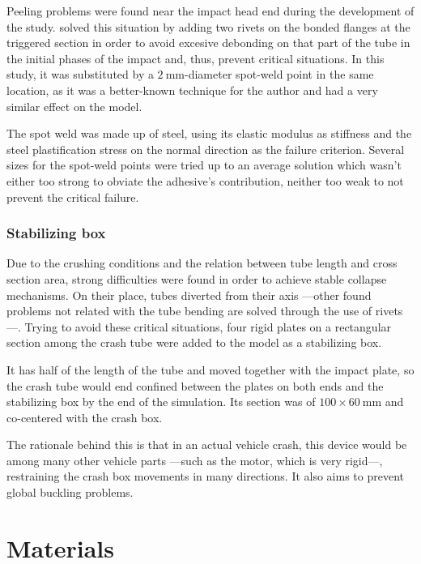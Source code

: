 \documentclass[
documentsize = a4, %
font = cmr, %
typesize = 11, %
printmode = true,
onehalfspacing = true,
language = en, %
titlepage = udciccp, %
degree = pt, %
dedication = true,
acknowledgements = true,
abstract-en = true,
abstract-es = false,
abstract-ga = false,
epigraphs = true,
toc = true,
lof = true,
lot = true,
frontmatterintoc = false,
notation = false,
minimal = false,
]{UDCthesis}
\begin{document}
Peeling problems were found near the impact head end during the development of the study. \citet{Peroni2009} solved this situation by adding two rivets on the bonded flanges at the triggered section in order to avoid excesive debonding on that part of the tube in the initial phases of the impact and, thus, prevent critical situations. In this study, it was substituted by a $\SI{2}{\mm}$-diameter spot-weld point in the same location, as it was a better-known technique for the author and had a very similar effect on the model.


The spot weld was made up of steel, using its elastic modulus as stiffness and the steel plastification stress on the normal direction as the failure criterion. Several sizes for the spot-weld points were tried up to an average solution which wasn't either too strong to obviate the adhesive's contribution, neither too weak to not prevent the critical failure.

\subsubsection{Stabilizing box}

Due to the crushing conditions and the relation between tube length and cross section area, strong difficulties were found in order to achieve stable collapse mechanisms. On their place, tubes diverted from their axis ---other found problems not related with the tube bending are solved through the use of rivets---. Trying to avoid these critical situations, four rigid plates on a rectangular section among the crash tube were added to the model as a stabilizing box.

It has half of the length of the tube and moved together with the impact plate, so the crash tube would end confined between the plates on both ends and the stabilizing box by the end of the simulation. Its section was of $\num{100}\times\SI{60}{\mm}$ and co-centered with the crash box.

The rationale behind this is that in an actual vehicle crash, this device would be among many other vehicle parts ---such as the motor, which is very rigid---, restraining the crash box movements in many directions. It also aims to prevent global buckling problems.

\section{Materials}
\end{document}
